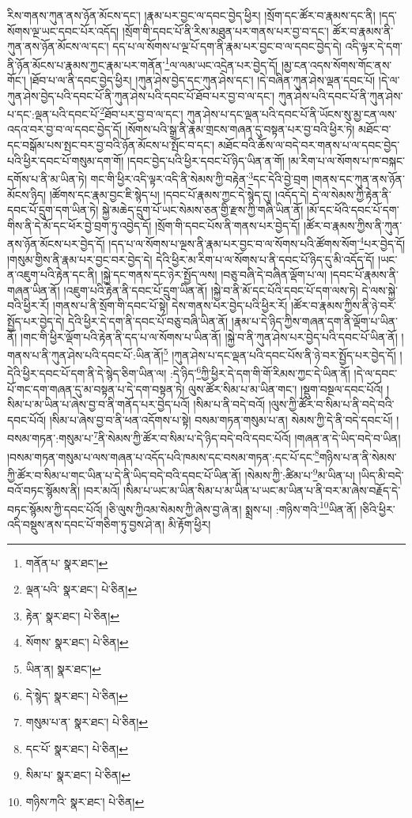 རིས་གནས་ཀུན་ནས་ཉོན་མོངས་དང་། །རྣམ་པར་བྱང་ལ་དབང་བྱེད་ཕྱིར། །སྲོག་དང་ཚོར་བ་རྣམས་དང་ནི། །དད་སོགས་ལྔ་ཡང་དབང་པོར་འདོད། །སྲོག་གི་དབང་པོ་ནི་རིས་མཐུན་པར་གནས་པར་བྱ་བ་དང་། ཚོར་བ་རྣམས་ནི་ཀུན་ནས་ཉོན་མོངས་ལ་དང་། དད་པ་ལ་སོགས་པ་ལྔ་པོ་དག་ནི་རྣམ་པར་བྱང་བ་ལ་དབང་བྱེད་དེ། འདི་ལྟར་དེ་དག་ནི་ཉོན་མོངས་པ་རྣམས་ཀྱང་རྣམ་པར་གནོན་\footnote{གནོན་པ་  སྣར་ཐང་། }ལ་ལམ་ཡང་འདྲེན་པར་བྱེད་དོ། །མྱ་ངན་འདས་སོགས་གོང་ནས་གོང་། །ཐོབ་པ་ལ་ནི་དབང་བྱེད་ཕྱིར། །ཀུན་ཤེས་བྱེད་དང་ཀུན་ཤེས་དང་། །དེ་བཞིན་ཀུན་ཤེས་ལྡན་དབང་པོ། །དེ་ལ་ཀུན་ཤེས་བྱེད་པའི་དབང་པོ་ནི་ཀུན་ཤེས་པའི་དབང་པོ་ཐོབ་པར་བྱ་བ་ལ་དང་། ཀུན་ཤེས་པའི་དབང་པོ་ནི་ཀུན་ཤེས་པ་དང་:ལྡན་པའི་དབང་པོ་\footnote{ལྡན་པའི་  སྣར་ཐང་།  པེ་ཅིན། }ཐོབ་པར་བྱ་བ་ལ་དང་། ཀུན་ཤེས་པ་དང་ལྡན་པའི་དབང་པོ་ནི་ཡོངས་སུ་མྱ་ངན་ལས་འདའ་བར་བྱ་བ་ལ་དབང་བྱེད་དོ། །སོགས་པའི་སྒྲ་ནི་རྣམ་གྲངས་གཞན་དུ་བསྟན་པར་བྱ་བའི་ཕྱིར་ཏེ། མཐོང་བ་དང་བསྒོམ་པས་སྤང་བར་བྱ་བའི་ཉོན་མོངས་པ་སྤོང་བ་དང་། མཐོང་བའི་ཆོས་ལ་བདེ་བར་གནས་པ་ལ་དབང་བྱེད་པའི་ཕྱིར་དབང་པོ་གསུམ་དག་གོ། །དབང་བྱེད་པའི་ཕྱིར་དབང་པོ་ཉིད་ཡིན་ན་གོ། །མ་རིག་པ་ལ་སོགས་པ་ཁ་བསྐང་དགོས་པ་ནི་མ་ཡིན་ཏེ། གང་གི་ཕྱིར་འདི་ལྟར་འདི་ནི་སེམས་ཀྱི་བརྟེན་\footnote{རྟེན་  སྣར་ཐང་།  པེ་ཅིན། }དང་དེའི་བྱེ་བྲག །གནས་དང་ཀུན་ནས་ཉོན་མོངས་ཉིད། །ཚོགས་དང་རྣམ་བྱང་ཇི་སྙེད་པ། །དབང་པོ་རྣམས་ཀྱང་དེ་སྙེད་དུ། །འདོད་དེ། དེ་ལ་སེམས་ཀྱི་རྟེན་ནི་དབང་པོ་དྲུག་དག་ཡིན་ཏེ། སྐྱེ་མཆེད་དྲུག་པོ་ཡང་སེམས་ཅན་གྱི་རྫས་ཀྱི་གཞི་ཡིན་ནོ། །མོ་དང་ཕོའི་དབང་པོ་དག་གིས་ནི་དེ་མོ་དང་ཕོར་བྱེ་བྲག་ཏུ་འབྱེད་དོ། །སྲོག་གི་དབང་པོས་ནི་གནས་པར་བྱེད་དོ། །ཚོར་བ་རྣམས་ཀྱིས་ནི་ཀུན་ནས་ཉོན་མོངས་པར་བྱེད་དོ། །དད་པ་ལ་སོགས་པ་ལྔས་ནི་རྣམ་པར་བྱང་བ་ལ་སོགས་པའི་ཚོགས་སོག་\footnote{སོགས་  སྣར་ཐང་།  པེ་ཅིན། }པར་བྱེད་དོ། །གསུམ་གྱིས་ནི་རྣམ་པར་བྱང་བར་བྱེད་དེ། དེའི་ཕྱིར་མ་རིག་པ་ལ་སོགས་པ་ནི་དབང་པོ་ཉིད་དུ་མི་འདོད་དོ། །ཡང་ན་འཇུག་པའི་རྟེན་དང་ནི། །སྐྱེ་དང་གནས་དང་ཉེར་སྤྱོད་ལས། །བཅུ་བཞི་དེ་བཞིན་ལྡོག་པ་ལ། །དབང་པོ་རྣམས་ནི་གཞན་ཡིན་ནོ། །འཇུག་པའི་རྟེན་ནི་དབང་པོ་དྲུག་ཡིན་ནོ། །སྐྱེ་བ་ནི་མོ་དང་པོའི་དབང་པོ་དག་ལས་ཏེ། དེ་ལས་སྐྱེ་བའི་ཕྱིར་རོ། །གནས་པ་ནི་སྲོག་གི་དབང་པོ་སྟེ། དེས་གནས་པར་བྱེད་པའི་ཕྱིར་རོ། །ཚོར་བ་རྣམས་ཀྱིས་ནི་ཉེ་བར་སྤྱོད་པར་བྱེད་དེ། དེའི་ཕྱིར་དེ་དག་ནི་དབང་པོ་བཅུ་བཞི་ཡིན་ནོ། །རྣམ་པ་དེ་ཉིད་ཀྱིས་གཞན་དག་ནི་ལྡོག་པ་ཡིན་ནོ། །གང་གི་ཕྱིར་ལྡོག་པའི་རྟེན་ནི་དད་པ་ལ་སོགས་པ་ཡིན་ནོ། །སྐྱེ་བ་ནི་ཀུན་ཤེས་པར་བྱེད་པའི་དབང་པོ་ཡིན་ནོ། །གནས་པ་ནི་ཀུན་ཤེས་པའི་དབང་པོ་:ཡིན་ནོ།\footnote{ཡིན་ན།  སྣར་ཐང་། } །ཀུན་ཤེས་པ་དང་ལྡན་པའི་དབང་པོས་ནི་ཉེ་བར་སྤྱོད་པར་བྱེད་དོ། །དེའི་ཕྱིར་དབང་པོ་དག་ནི་དེ་སྙེད་ཅིག་ཡིན་ལ། :དེ་ཉིད་\footnote{དེ་སྙེད་  སྣར་ཐང་།  པེ་ཅིན། }ཀྱི་ཕྱིར་དེ་དག་གི་གོ་རིམས་ཀྱང་དེ་ཡིན་ནོ། །དེ་ལ་དབང་པོ་གང་དག་གཞན་དུ་མ་བསྟན་པ་དེ་དག་བསྟན་ཏེ། ལུས་ཚོར་སིམ་པ་མ་ཡིན་གང་། །སྡུག་བསྔལ་དབང་པོའོ། །སིམ་པ་མ་ཡིན་པ་ཞེས་བྱ་བ་ནི་གནོད་པར་བྱེད་པའོ། །སིམ་པ་ནི་བདེ་བའོ། །ལུས་ཀྱི་ཚོར་བ་སིམ་པ་ནི་བདེ་བའི་དབང་པོའོ། །སིམ་པ་ཞེས་བྱ་བ་ནི་ཕན་འདོགས་པ་སྟེ། བསམ་གཏན་གསུམ་པ་ན། སེམས་ཀྱི་དེ་ནི་བདེ་དབང་པོ། །བསམ་གཏན་:གསུམ་པ་\footnote{གསུམ་པ་ན་  སྣར་ཐང་།  པེ་ཅིན། }ནི་སེམས་ཀྱི་ཚོར་བ་སིམ་པ་དེ་ཉིད་བདེ་བའི་དབང་པོའོ། །གཞན་ན་དེ་ཡིད་བདེ་བ་ཡིན། །བསམ་གཏན་གསུམ་པ་ལས་གཞན་པ་འདོད་པའི་ཁམས་དང་བསམ་གཏན་:དང་པོ་དང་\footnote{དང་པོ་  སྣར་ཐང་།  པེ་ཅིན། }གཉིས་པ་ན་ནི་སེམས་ཀྱི་ཚོར་བ་སིམ་པ་གང་ཡིན་པ་དེ་ནི་ཡིད་བདེ་བའི་དབང་པོ་ཡིན་ནོ། །སེམས་ཀྱི་:ཚིམ་པ་\footnote{སིམ་པ་  སྣར་ཐང་།  པེ་ཅིན། }མ་ཡིན་པ། །ཡིད་མི་བདེ་བའོ་བཏང་སྙོམས་ནི། །བར་མའོ། །སིམ་པ་ཡང་མ་ཡིན་སིམ་པ་མ་ཡིན་པ་ཡང་མ་ཡིན་པ་ནི་བར་མ་ཞེས་བརྗོད་དེ་བཏང་སྙོམས་ཀྱི་དབང་པོའོ། །ཅི་ལུས་ཀྱིའམ་སེམས་ཀྱི་ཞེས་བྱ་ཞེ་ན། སྨྲས་པ། :གཉིས་གའི་\footnote{གཉིས་ཀའི་  སྣར་ཐང་།  པེ་ཅིན། }ཡིན་ནོ། །ཅིའི་ཕྱིར་འདི་བསྡུས་ནས་དབང་པོ་གཅིག་ཏུ་བྱས་ཤེ་ན། མི་རྟོག་ཕྱིར། 